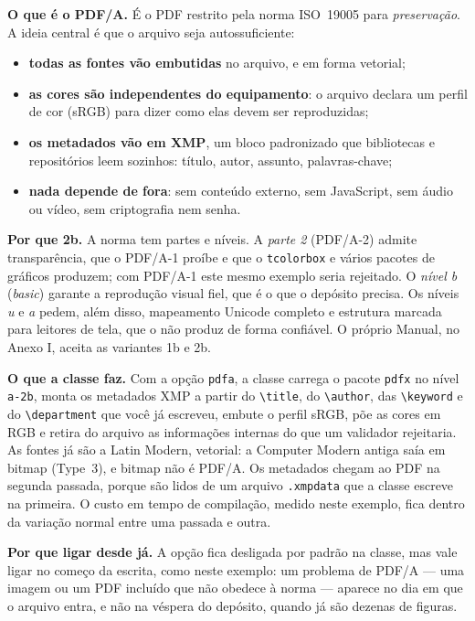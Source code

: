 \documentclass[dsc,setavermelha,numeracaoporcapitulo,linhanafolhaderosto]{ufrj}
\theoremstyle{plain}
\theoremstyle{definition}
\theoremstyle{remark}
\begin{document}
\textbf{O que é o PDF/A.} É o PDF restrito pela norma ISO~19005 para \emph{preservação}. A ideia central é que o arquivo seja autossuficiente:
\begin{itemize}
  \item \textbf{todas as fontes vão embutidas} no arquivo, e em forma vetorial;
  \item \textbf{as cores são independentes do equipamento}: o arquivo declara um perfil de cor (sRGB) para dizer como elas devem ser reproduzidas;
  \item \textbf{os metadados vão em XMP}, um bloco padronizado que bibliotecas e repositórios leem sozinhos: título, autor, assunto, palavras-chave;
  \item \textbf{nada depende de fora}: sem conteúdo externo, sem JavaScript, sem áudio ou vídeo, sem criptografia nem senha.
\end{itemize}

\textbf{Por que 2b.} A norma tem partes e níveis. A \emph{parte 2} (PDF/A-2) admite transparência, que o PDF/A-1 proíbe e que o \verb|tcolorbox| e vários pacotes de gráficos produzem; com PDF/A-1 este mesmo exemplo seria rejeitado. O \emph{nível b} (\emph{basic}) garante a reprodução visual fiel, que é o que o depósito precisa. Os níveis \emph{u} e \emph{a} pedem, além disso, mapeamento Unicode completo e estrutura marcada para leitores de tela, que o  não produz de forma confiável. O próprio Manual, no Anexo I, aceita as variantes 1b e 2b.

\textbf{O que a classe faz.} Com a opção \verb|pdfa|, a classe carrega o pacote \verb|pdfx| no nível \verb|a-2b|, monta os metadados XMP a partir do \verb|\title|, do \verb|\author|, das \verb|\keyword| e do \verb|\department| que você já escreveu, embute o perfil sRGB, põe as cores em RGB e retira do arquivo as informações internas do  que um validador rejeitaria. As fontes já são a Latin Modern, vetorial: a Computer Modern antiga saía em bitmap (Type~3), e bitmap não é PDF/A. Os metadados chegam ao PDF na segunda passada, porque são lidos de um arquivo \verb|.xmpdata| que a classe escreve na primeira. O custo em tempo de compilação, medido neste exemplo, fica dentro da variação normal entre uma passada e outra.

\textbf{Por que ligar desde já.} A opção fica desligada por padrão na classe, mas vale ligar no começo da escrita, como neste exemplo: um problema de PDF/A --- uma imagem ou um PDF incluído que não obedece à norma --- aparece no dia em que o arquivo entra, e não na véspera do depósito, quando já são dezenas de figuras.
\end{document}
